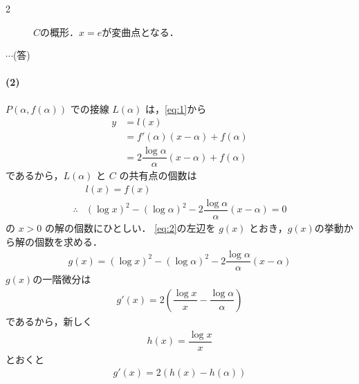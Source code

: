\documentclass[../../main.tex]{subfiles}
\begin{document}
\begin{multicols}{2}
\begin{figure}[H]
    \caption{$C$の概形．$x=e$が変曲点となる．}
    \label{2010-2:fig:1}
  \end{figure}

  $\cdots$(答)

  \paragraph{(2)}
  $P(\alpha, f(\alpha))$ での接線 $L(\alpha)$ は，\cref{eq:1}から
  \begin{align}
    y
    & = l(x)                                               \\
    & = f'(\alpha) (x - \alpha) + f(\alpha)                     \\
    & = 2\dfrac{\log \alpha}{\alpha} (x-\alpha) + f(\alpha)
  \end{align}
  であるから，$L(\alpha)$ と $C$ の共有点の個数は
  \begin{align}
    & l(x) = f(x)                                                                                   \\
    \therefore
    & (\log x)^2 - (\log \alpha)^2 - 2\dfrac{\log \alpha}{\alpha} (x-\alpha) = 0 \label{eq:2}
  \end{align}
  の $x>0$ の解の個数にひとしい．
  \cref{eq:2}の左辺を $g(x)$ とおき，$g(x)$の挙動から解の個数を求める．
  \begin{align}
    g(x) = (\log x)^2 - (\log \alpha)^2 - 2\dfrac{\log \alpha}{\alpha} (x-\alpha)
  \end{align}
  $g(x)$の一階微分は
  \begin{align}
    g'(x) = 2 \left( \dfrac{\log x}{x} - \dfrac{\log \alpha}{\alpha} \right)
  \end{align}
  であるから，新しく
  \begin{align}
    h(x) = \dfrac{\log x}{x}
  \end{align}
  とおくと
  \begin{align}
    g'(x) = 2 \left(h(x)-h(\alpha)\right)

\end{align}
\end{multicols}
\end{document}
